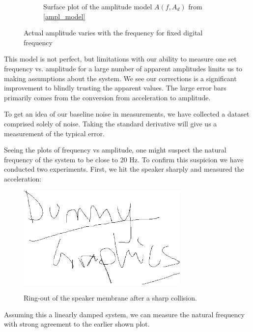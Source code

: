 \documentclass[12pt,oneside,a4paper]{article}
\numberwithin{equation}{section}
\begin{document}
{{{{\begin{figure}[h]
\begin{subfigure}[t]{0.49\textwidth}
		\caption{Surface plot of the amplitude model $A(f,A_{d})$ from \eqref{ampl_model}}
	\end{subfigure}
	\caption{Actual amplitude varies with the frequency for fixed digital frequency}
\end{figure}

 This model is not perfect, but limitations with our ability to measure one set frequency vs. amplitude for a large number of apparent amplitudes limits us to making assumptions about the system. We see our corrections is a significant improvement to blindly trusting the apparent values. The large error bars primarily comes from the conversion from acceleration to amplitude.

To get an idea of our baseline noise in measurements, we have collected a dataset comprised solely of noise. Taking the standard derivative will give us a measurement of the typical error. 

Seeing the plots of frequency vs amplitude, one might suspect the natural frequency of the system to be close to 20 Hz. To confirm this suspicion we have conducted two experiments. First, we hit the speaker sharply and measured the acceleration: 
\begin{figure}[h!]
	\centering
	\includegraphics[width=0.75\textwidth]{dummy.png} \label{nat_freq}
	\caption{Ring-out of the speaker membrane after a sharp collision.}
\end{figure}
Assuming this a linearly damped system, we can measure the natural frequency with strong agreement to the earlier shown plot. 

}}}}
\end{document}
